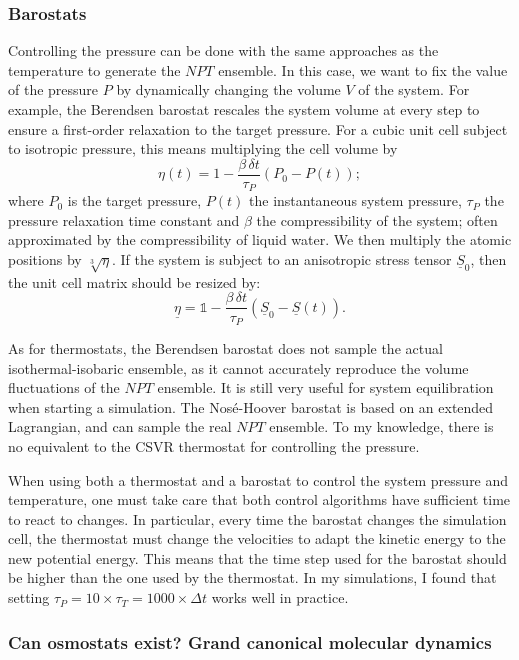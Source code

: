 \documentclass[thesis]{subfiles}
\begin{document}
\subsubsection{Barostats}

Controlling the pressure can be done with the same approaches as the temperature
to generate the $NPT$ ensemble. In this case, we want to fix the value of the
pressure $P$ by dynamically changing the volume $V$ of the system. For example,
the Berendsen barostat\cite{Berendsen1984} rescales the system volume at every
step to ensure a first-order relaxation to the target pressure. For a cubic unit
cell subject to isotropic pressure, this means multiplying the cell volume by
\[ \eta(t) = 1 - \frac{\beta\,\delta t}{\tau_P} \left(P_0 - P(t)\right);\]
where $P_0$ is the target pressure, $P(t)$ the instantaneous system pressure,
$\tau_P$ the pressure relaxation time constant and $\beta$ the compressibility
of the system; often approximated by the compressibility of liquid water. We
then multiply the atomic positions by $\sqrt[3]{\eta}$. If the system is subject
to an anisotropic stress tensor $\underline{S}_0$, then the unit cell matrix
should be resized by:
\[ \underline{\eta} = \mathds{1} - \frac{\beta\,\delta t}{\tau_P} \left(\underline{S}_0 - \underline{S}(t)\right). \]

As for thermostats, the Berendsen barostat does not sample the actual
isothermal-isobaric ensemble, as it cannot accurately reproduce the volume
fluctuations of the $NPT$ ensemble. It is still very useful for system
equilibration when starting a simulation. The Nosé-Hoover barostat is based on
an extended Lagrangian, and can sample the real $NPT$
ensemble\cite{Tuckerman2010}. To my knowledge, there is no equivalent to the
CSVR thermostat for controlling the pressure.

When using both a thermostat and a barostat to control the system pressure and
temperature, one must take care that both control algorithms have sufficient
time to react to changes. In particular, every time the barostat changes the
simulation cell, the thermostat must change the velocities to adapt the kinetic
energy to the new potential energy. This means that the time step used for the
barostat should be higher than the one used by the thermostat. In my
simulations, I found that setting $\tau_P = 10 \times \tau_T = 1000 \times \Delta
t$ works well in practice.

\subsubsection{Can osmostats exist? Grand canonical molecular dynamics}
\label{sec:gcmd}
\end{document}
